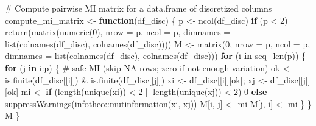 \documentclass[
  letterpaper,
  DIV=11,
  numbers=noendperiod]{scrartcl}
\newenvironment{Shaded}{\begin{snugshade}}{\end{snugshade}}
\newcommand{\AttributeTok}[1]{\textcolor[rgb]{0.40,0.45,0.13}{#1}}
\newcommand{\CommentTok}[1]{\textcolor[rgb]{0.37,0.37,0.37}{#1}}
\newcommand{\ControlFlowTok}[1]{\textcolor[rgb]{0.00,0.23,0.31}{\textbf{#1}}}
\newcommand{\DecValTok}[1]{\textcolor[rgb]{0.68,0.00,0.00}{#1}}
\newcommand{\FunctionTok}[1]{\textcolor[rgb]{0.28,0.35,0.67}{#1}}
\newcommand{\NormalTok}[1]{\textcolor[rgb]{0.00,0.23,0.31}{#1}}
\newcommand{\OtherTok}[1]{\textcolor[rgb]{0.00,0.23,0.31}{#1}}
\newcommand{\SpecialCharTok}[1]{\textcolor[rgb]{0.37,0.37,0.37}{#1}}
\begin{document}
\begin{Shaded}
\begin{Highlighting}[]
\CommentTok{\# Compute pairwise MI matrix for a data.frame of discretized columns}
\NormalTok{compute\_mi\_matrix }\OtherTok{\textless{}{-}} \ControlFlowTok{function}\NormalTok{(df\_disc) \{}
\NormalTok{  p }\OtherTok{\textless{}{-}} \FunctionTok{ncol}\NormalTok{(df\_disc)}
  \ControlFlowTok{if}\NormalTok{ (p }\SpecialCharTok{\textless{}} \DecValTok{2}\NormalTok{) }\FunctionTok{return}\NormalTok{(}\FunctionTok{matrix}\NormalTok{(}\FunctionTok{numeric}\NormalTok{(}\DecValTok{0}\NormalTok{), }\AttributeTok{nrow =}\NormalTok{ p, }\AttributeTok{ncol =}\NormalTok{ p,}
                           \AttributeTok{dimnames =} \FunctionTok{list}\NormalTok{(}\FunctionTok{colnames}\NormalTok{(df\_disc), }\FunctionTok{colnames}\NormalTok{(df\_disc))))}
\NormalTok{  M }\OtherTok{\textless{}{-}} \FunctionTok{matrix}\NormalTok{(}\DecValTok{0}\NormalTok{, }\AttributeTok{nrow =}\NormalTok{ p, }\AttributeTok{ncol =}\NormalTok{ p,}
              \AttributeTok{dimnames =} \FunctionTok{list}\NormalTok{(}\FunctionTok{colnames}\NormalTok{(df\_disc), }\FunctionTok{colnames}\NormalTok{(df\_disc)))}
  \ControlFlowTok{for}\NormalTok{ (i }\ControlFlowTok{in} \FunctionTok{seq\_len}\NormalTok{(p)) \{}
    \ControlFlowTok{for}\NormalTok{ (j }\ControlFlowTok{in}\NormalTok{ i}\SpecialCharTok{:}\NormalTok{p) \{}
      \CommentTok{\# safe MI (skip NA rows; zero if not enough variation)}
\NormalTok{      ok }\OtherTok{\textless{}{-}} \FunctionTok{is.finite}\NormalTok{(df\_disc[[i]]) }\SpecialCharTok{\&} \FunctionTok{is.finite}\NormalTok{(df\_disc[[j]])}
\NormalTok{      xi }\OtherTok{\textless{}{-}}\NormalTok{ df\_disc[[i]][ok]; xj }\OtherTok{\textless{}{-}}\NormalTok{ df\_disc[[j]][ok]}
\NormalTok{      mi }\OtherTok{\textless{}{-}} \ControlFlowTok{if}\NormalTok{ (}\FunctionTok{length}\NormalTok{(}\FunctionTok{unique}\NormalTok{(xi)) }\SpecialCharTok{\textless{}} \DecValTok{2} \SpecialCharTok{||} \FunctionTok{length}\NormalTok{(}\FunctionTok{unique}\NormalTok{(xj)) }\SpecialCharTok{\textless{}} \DecValTok{2}\NormalTok{) }\DecValTok{0} \ControlFlowTok{else}
        \FunctionTok{suppressWarnings}\NormalTok{(infotheo}\SpecialCharTok{::}\FunctionTok{mutinformation}\NormalTok{(xi, xj))}
\NormalTok{      M[i, j] }\OtherTok{\textless{}{-}}\NormalTok{ mi}
\NormalTok{      M[j, i] }\OtherTok{\textless{}{-}}\NormalTok{ mi}
\NormalTok{    \}}
\NormalTok{  \}}
\NormalTok{  M}
\NormalTok{\}}


\end{Highlighting}
\end{Shaded}
\end{document}
